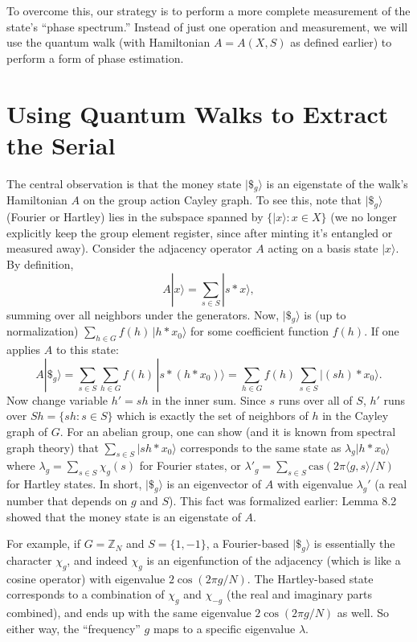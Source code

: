 \documentclass[11pt]{article}
\theoremstyle{definition}
\newcommand{\cas}{\mathrm{cas}}
\begin{document}
    To overcome this, our strategy is to perform a more complete measurement of the state’s “phase spectrum.” Instead of just one operation and measurement, we will use the quantum walk (with Hamiltonian $A = A(X,S)$ as defined earlier) to perform a form of phase estimation.

    \section{Using Quantum Walks to Extract the Serial}
    The central observation is that the money state $|\$_g\rangle$ is an eigenstate of the walk’s Hamiltonian $A$ on the group action Cayley graph. To see this, note that $|\$_g\rangle$ (Fourier or Hartley) lies in the subspace spanned by $\{|x\rangle: x \in X\}$ (we no longer explicitly keep the group element register, since after minting it’s entangled or measured away). Consider the adjacency operator $A$ acting on a basis state $|x\rangle$. By definition,
    \[ A |x\rangle = \sum_{s \in S} |s * x\rangle, \] 
    summing over all neighbors under the generators. Now, $|\$_g\rangle$ is (up to normalization) $\sum_{h \in G} f(h)\, |h * x_0\rangle$ for some coefficient function $f(h)$. If one applies $A$ to this state:
    \[ A |\$_g\rangle = \sum_{s \in S} \sum_{h \in G} f(h)\, |s * (h * x_0)\rangle = \sum_{h \in G} f(h)\, \sum_{s \in S} |(sh) * x_0\rangle. \]
    Now change variable $h' = sh$ in the inner sum. Since $s$ runs over all of $S$, $h'$ runs over $S h = \{sh: s \in S\}$ which is exactly the set of neighbors of $h$ in the Cayley graph of $G$. For an abelian group, one can show (and it is known from spectral graph theory) that $\sum_{s \in S} |sh * x_0\rangle$ corresponds to the same state as $\lambda_g |h * x_0\rangle$ where $\lambda_g = \sum_{s\in S} \chi_g(s)$ for Fourier states, or $\lambda'_g = \sum_{s\in S} \cas(2\pi \langle g,s\rangle/N)$ for Hartley states. In short, $|\$_g\rangle$ is an eigenvector of $A$ with eigenvalue $\lambda_g'$ (a real number that depends on $g$ and $S$). This fact was formalized earlier: Lemma 8.2 showed that the money state is an eigenstate of $A$.

    For example, if $G = \mathbb{Z}_N$ and $S=\{1, -1\}$, a Fourier-based $|\$_g\rangle$ is essentially the character $\chi_g$, and indeed $\chi_g$ is an eigenfunction of the adjacency (which is like a cosine operator) with eigenvalue $2\cos(2\pi g/N)$. The Hartley-based state corresponds to a combination of $\chi_g$ and $\chi_{-g}$ (the real and imaginary parts combined), and ends up with the same eigenvalue $2\cos(2\pi g/N)$ as well. So either way, the “frequency” $g$ maps to a specific eigenvalue $\lambda$.
\end{document}
